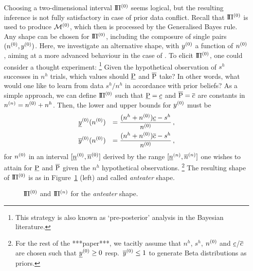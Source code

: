 Choosing a two-dimensional interval $\text{I}\!\Pi^{(0)}$ seems logical,
but the resulting inference is not fully satisfactory in case of prior data conflict.
Recall that $\text{I}\!\Pi^{(0)}$ is used to produce $\mathcal{M}^{(0)}$, %
which then is processed by the Generalised Bayes rule. Any shape can be chosen for $\text{I}\!\Pi^{(0)}$,
including the composure of single pairs $(n^{(0)}, y^{(0)})$. %
Here, we investigate
an alternative shape, with $y^{(0)}$ a function of $n^{(0)}$, aiming at a more advanced behaviour in the case of \pdc.
To elicit $\text{I}\!\Pi^{(0)}$, one could consider a thought experiment:%
\footnote{This strategy is also known as `pre-posterior' analysis in the Bayesian literature.}
Given the hypothetical observation of $s^h$ successes in $n^h$ trials,
which values should $\underline{\operatorname{P}}$ and $\overline{\operatorname{P}}$ take? In other words, what
would one like to learn from data $s^h/n^h$ in accordance with
prior beliefs? As a simple approach, we can define $\text{I}\!\Pi^{(0)}$ such
that $\underline{\operatorname{P}} = \underline{c}$ and $\overline{\operatorname{P}} = \overline{c}$ are constants in $n^{(n)} = n^{(0)} + n^h$.
Then, the lower and upper bounds for $y^{(0)}$ must be %
\begin{equation} \label{equ:anteater-y0}
\begin{aligned}
&
\underline{y}^{(0)}(n^{(0)}) &= \frac{(n^h + n^{(0)})\underline{c} - s^h}{n^{(0)}}\,, \\
&
\overline{y}^{(0)}(n^{(0)}) &= \frac{(n^h + n^{(0)})\overline{c} - s^h}{n^{(0)}}\,,
\end{aligned}
\end{equation}
for $n^{(0)}$ in an interval $[\underline{n}^{(0)}, \overline{n}^{(0)}]$ derived by the range $[\underline{n}^{(n)}, \overline{n}^{(n)}]$ one wishes to attain for $\underline{\operatorname{P}}$ and $\overline{\operatorname{P}}$
given the $n^h$ hypothetical observations.%
\footnote{For the rest of the ***paper***, we tacitly assume that $n^h$, $s^h$, $n^{(0)}$ and $\underline{c}$/$\overline{c}$
are chosen such that $\underline{y}^{(0)} \geq 0$ resp.\ $\overline{y}^{(0)} \leq 1$ to generate Beta distributions as priors.}
The resulting shape of $\text{I}\!\Pi^{(0)}$ is as in Figure~\ref{fig:anteater-ex1} (left) and called \emph{anteater} shape.
%
\begin{figure}%
\caption{$\text{I}\!\Pi^{(0)}$ and $\text{I}\!\Pi^{(n)}$ for the \emph{anteater} shape.}
\label{fig:anteater-ex1}
\end{figure}
